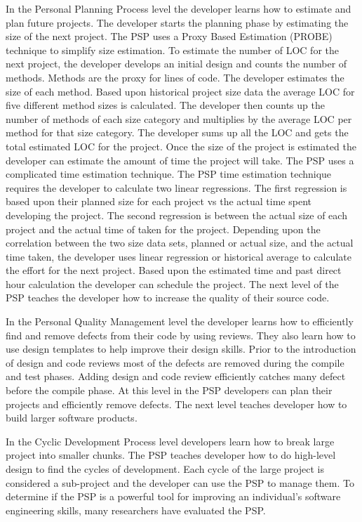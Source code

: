 In the Personal Planning Process level the developer learns how to estimate and plan
future projects.  The developer starts the planning phase by estimating the
size of the next project.  The PSP uses a Proxy Based Estimation (PROBE)
technique to simplify size estimation.  To estimate the number of LOC for the
next project, the developer develops an initial design and counts the number of
methods.  Methods are the proxy for lines of code.  The developer estimates the
size of each method.  Based upon historical project size data the average LOC
for five different method sizes is calculated.  The developer then counts up
the number of methods of each size category and multiplies by the average LOC
per method for that size category.  The developer sums up all the LOC and gets
the total estimated LOC for the project.  Once the size of the project is
estimated the developer can estimate the amount of time the project will take.
The PSP uses a complicated time estimation technique.  The PSP time estimation
technique requires the developer to calculate two linear regressions.  The
first regression is based upon their planned size for each project vs the
actual time spent developing the project.  The second regression is between the
actual size of each project and the actual time of taken for the project.
Depending upon the correlation between the two size data sets, planned or
actual size, and the actual time taken, the developer uses linear regression or
historical average to calculate the effort for the next project.  Based upon
the estimated time and past direct hour calculation the developer can schedule
the project.  The next level of the PSP teaches the developer how to increase
the quality of their source code.

In the Personal Quality Management level the developer learns how to
efficiently find and remove defects from their code by using reviews.  They
also learn how to use design templates to help improve their design skills.
Prior to the introduction of design and code reviews most of the defects are
removed during the compile and test phases.  Adding design and code review
efficiently catches many defect before the compile phase.  At this level in the 
PSP developers can plan their projects and efficiently remove defects.  The
next level teaches developer how to build larger software products.

In the Cyclic Development Process level developers learn how to break large
project into smaller chunks.  The PSP teaches developer how to do high-level
design to find the cycles of development.  Each cycle of the large project is
considered a sub-project and the developer can use the PSP to manage them.  To
determine if the PSP is a powerful tool for improving an individual's software
engineering skills, many researchers have evaluated the PSP.

